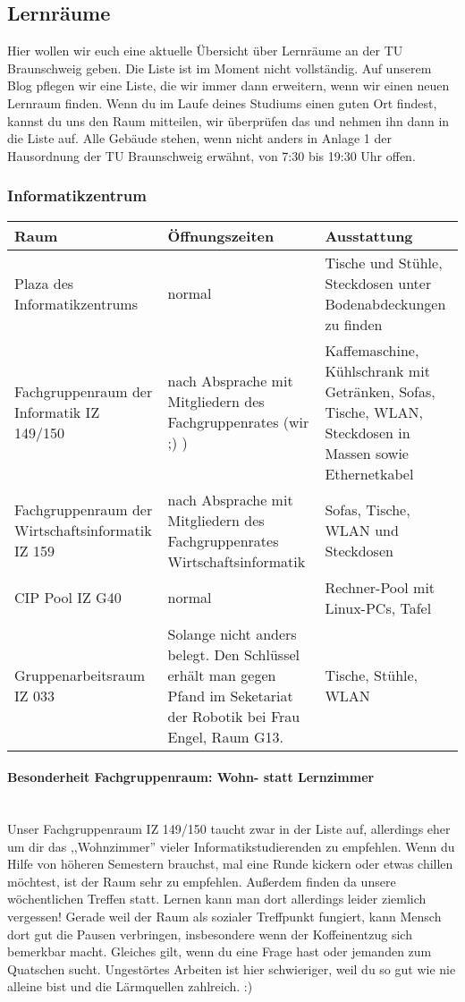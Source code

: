 \subsection{Lernräume}
	Hier wollen wir euch eine aktuelle Übersicht über Lernräume an der TU Braunschweig geben. Die Liste ist im Moment nicht vollständig. Auf unserem Blog pflegen wir eine Liste, die wir immer dann erweitern, wenn wir einen neuen Lernraum finden.
Wenn du im Laufe deines Studiums einen guten Ort findest, kannst du uns den Raum mitteilen, wir überprüfen das und nehmen ihn dann in die Liste auf. Alle Gebäude stehen, wenn nicht anders in Anlage 1 der Hausordnung der TU Braunschweig erwähnt, von 7:30 bis 19:30 Uhr offen.
	\subsubsection*{Informatikzentrum}
		\begin{tabular}{|p{4cm}|p{5cm}|p{8cm}|}
			\hline Raum & Öffnungszeiten & Ausstattung \\ 
			\hline Plaza des Informatikzentrums & normal &  Tische und Stühle, Steckdosen unter Bodenabdeckungen zu finden \\
			\hline Fachgruppenraum der Informatik IZ 149/150 &
			nach Absprache mit Mitgliedern des
			Fachgruppenrates (wir ;) ) & Kaffemaschine,
			Kühlschrank mit Getränken, 
			Sofas, Tische, WLAN, Steckdosen in Massen sowie Ethernetkabel\\ 
			\hline Fachgruppenraum der Wirtschaftsinformatik
			IZ 159 & nach Absprache mit Mitgliedern des
			Fachgruppenrates Wirtschaftsinformatik & Sofas, Tische, WLAN und Steckdosen \\ 
			\hline CIP Pool IZ G40 & normal & Rechner-Pool mit Linux-PCs, Tafel\\ 
			\hline Gruppenarbeitsraum IZ 033 & 
			
			Solange nicht anders belegt. Den Schlüssel
			erhält man gegen Pfand im Seketariat der Robotik bei Frau Engel,
			Raum G13.
			 &
			Tische, Stühle, WLAN
			\\
			\hline
		\end{tabular}
	\paragraph{Besonderheit Fachgruppenraum: Wohn- statt
	Lernzimmer}\ \\
	Unser Fachgruppenraum IZ 149/150 taucht zwar in der Liste auf,
	allerdings eher um dir das  ,,Wohnzimmer'' vieler
	Informatikstudierenden  zu empfehlen. Wenn du  Hilfe von höheren
	Semestern brauchst, mal eine
	Runde kickern oder etwas chillen möchtest, ist der Raum
	sehr zu empfehlen. Außerdem finden da unsere wöchentlichen
	Treffen statt. Lernen kann man dort allerdings leider ziemlich
	vergessen! Gerade weil der Raum als sozialer Treffpunkt
	fungiert, kann Mensch dort gut die Pausen verbringen,
	insbesondere wenn der Koffeinentzug sich bemerkbar macht.
	Gleiches gilt, wenn du eine Frage hast oder jemanden zum
	Quatschen sucht. Ungestörtes Arbeiten ist hier
	schwieriger, weil du so gut wie nie alleine bist und die
	Lärmquellen zahlreich. :)
